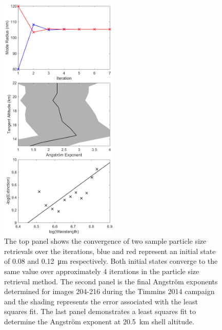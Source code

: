 \documentclass[12pt]{article}
\begin{document}
\begin{figure}
\includegraphics[width=0.5\textwidth]{./Images/5-4-ParticalSize.pdf}
    \caption{The top panel shows the convergence of two sample particle size retrievals over the iterations, blue and red represent an initial state of 0.08 and 0.12~\si{\micro\metre} respectively. Both initial states converge to the same value over approximately 4 iterations in the particle size retrieval method. The second panel is the final Angstr\"{o}m exponents determined for images 204-216 during the Timmins 2014 campaign and the shading represents the error associated with the least squares fit. The last panel demonstrates a least squares fit to determine the Angstr\"{o}m exponent at 20.5~km shell altitude.}
    \label{fig:ParticleSize}
\end{figure}
\end{document}
